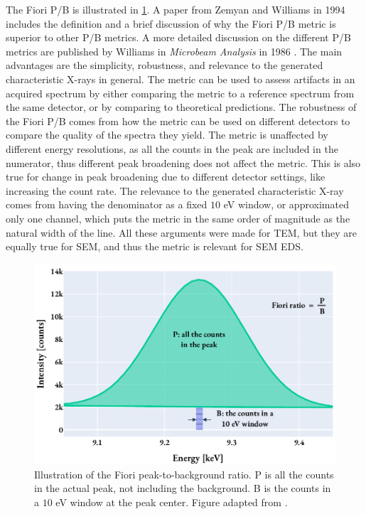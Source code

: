 The Fiori P/B is illustrated in \cref{fig:fiori_pb}.
A paper from Zemyan and Williams in 1994 \cite{zemyan_standard_performance_1994} includes the definition and a brief discussion of why the Fiori P/B metric is superior to other P/B metrics.
A more detailed discussion on the different P/B metrics are published by Williams in \emph{Microbeam Analysis} in 1986 \cite{williams_standard_definitions_1986}.
The main advantages are the simplicity, robustness, and relevance to the generated characteristic X-rays in general.
The metric can be used to assess artifacts in an acquired spectrum by either comparing the metric to a reference spectrum from the same detector, or by comparing to theoretical predictions.
The robustness of the Fiori P/B comes from how the metric can be used on different detectors to compare the quality of the spectra they yield.
The metric is unaffected by different energy resolutions, as all the counts in the peak are included in the numerator, thus different peak broadening does not affect the metric.
This is also true for change in peak broadening due to different detector settings, like increasing the count rate.
The relevance to the generated characteristic X-ray comes from having the denominator as a fixed $10$ eV window, or approximated only one channel, which puts the metric in the same order of magnitude as the natural width of the line.
All these arguments were made for TEM, but they are equally true for SEM, and thus the metric is relevant for SEM EDS.


\begin{figure}[htbp]
    \centering
    \includegraphics[width=0.8\linewidth]{figures/pp_fiori_definition.pdf}
    \caption{
        Illustration of the Fiori peak-to-background ratio.
        P is all the counts in the actual peak, not including the background.
        B is the counts in a $10$ eV window at the peak center.
        Figure adapted from \cite{zemyan_standard_performance_1994}.
        }
    \label{fig:fiori_pb}
\end{figure}

